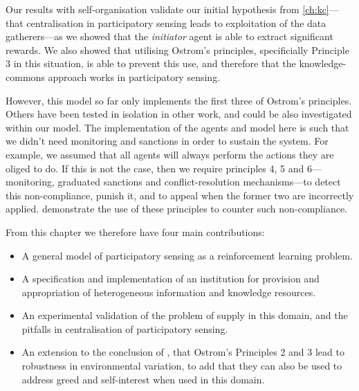 Our results with self-organisation validate our initial hypothesis from
\autoref{ch:kc}---that centralisation in participatory sensing leads to
exploitation of the data gatherers---as we showed that the \emph{initiator}
agent is able to extract significant rewards. We also showed that utilising
Ostrom's principles, specificially Principle 3 in this situation, is able to
prevent this use, and therefore that the knowledge-commons approach works in
participatory sensing.

However, this model so far only implements the first three of Ostrom's
principles. Others have been tested in isolation in other work, and
could be also investigated within our model. The implementation of the agents
and model here is such that we didn't need monitoring and sanctions in order
to sustain the system. For example, we assumed that all agents will always
perform the actions they are oliged to do. If this is not the case, then we
require principles 4, 5 and 6---monitoring, graduated sanctions and 
conflict-resolution mechanisms---to detect this non-compliance, punish it, and to
appeal when the former two are incorrectly applied. \citet{Pitt2012b}
demonstrate the use of these principles to counter such non-compliance.

From this chapter we therefore have four main contributions:
\begin{itemize}
\item A general model of participatory sensing as a reinforcement learning problem.
\item A specification and implementation of an institution for provision and appropriation of heterogeneous information and knowledge resources.
\item An experimental validation of the problem of supply in this domain, and the pitfalls in centralisation of participatory sensing.
\item An extension to the conclusion of \citet{Pitt2012b}, that Ostrom's Principles 2 and 3 lead to robustness in environmental variation, to add that they can also be used to address greed and self-interest when used in this domain.
\end{itemize}


